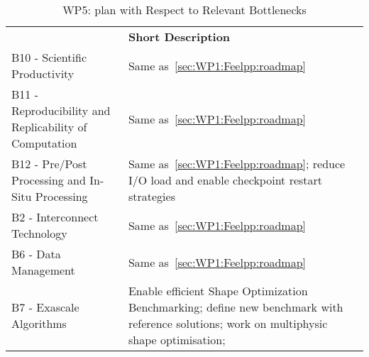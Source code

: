 \begin{table}[!ht]
    \centering



    \centering
    {
        \setlength{\parindent}{0pt}
        \def\arraystretch{1.25}
        {
            \fontsize{9}{11}\selectfont
            \begin{tabular}{!{\color{numpexgray}\vrule}p{.25\linewidth}!{\color{numpexgray}\vrule}p{.6885\linewidth}!{\color{numpexgray}\vrule}}

     &  {\rule{0pt}{2.5ex}\color{white}\bf Short Description }\\

    B10 - Scientific Productivity & Same as~\cref{sec:WP1:Feelpp:roadmap}\\
    B11 - Reproducibility and Replicability of Computation & Same as~\cref{sec:WP1:Feelpp:roadmap} \\
    B12 - Pre/Post Processing and In-Situ Processing & Same as~\cref{sec:WP1:Feelpp:roadmap}; reduce I/O load and enable checkpoint restart strategies \\
    B2 - Interconnect Technology & Same as~\cref{sec:WP1:Feelpp:roadmap} \\
    B6 - Data Management & Same as~\cref{sec:WP1:Feelpp:roadmap}  \\
    B7 - Exascale Algorithms & Enable efficient Shape Optimization Benchmarking; define new benchmark with reference solutions; work on multiphysic shape optimisation; \\
\end{tabular}
        }
    }
    \caption{WP5: \Feelpp plan with Respect to Relevant Bottlenecks}
    \label{tab:WP5:Feelpp:bottlenecks}
\end{table}